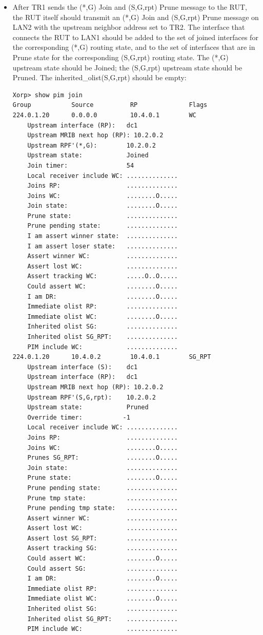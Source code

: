 \documentclass[11pt]{report}
\begin{document}
\begin{itemize}

  \item After TR1 sends the (*,G) Join and (S,G,rpt) Prune message to the RUT,
  the RUT itself should transmit an (*,G) Join and (S,G,rpt) Prune message on
  LAN2 with the upstream neighbor address set to TR2. The interface that
  connects the RUT to LAN1 should be added to the set of joined interfaces for
  the corresponding (*,G) routing state, and to the set of interfaces that are
  in Prune state for the corresponding (S,G,rpt) routing state. The (*,G)
  upstream state should be Joined; the (S,G,rpt) upstream state should be
  Pruned. The inherited\_olist(S,G,rpt) should be empty:

\begin{verbatim}
Xorp> show pim join 
Group           Source          RP              Flags
224.0.1.20      0.0.0.0         10.4.0.1        WC   
    Upstream interface (RP):   dc1
    Upstream MRIB next hop (RP): 10.2.0.2
    Upstream RPF'(*,G):        10.2.0.2
    Upstream state:            Joined 
    Join timer:                54
    Local receiver include WC: ..............
    Joins RP:                  ..............
    Joins WC:                  ........O.....
    Join state:                ........O.....
    Prune state:               ..............
    Prune pending state:       ..............
    I am assert winner state:  ..............
    I am assert loser state:   ..............
    Assert winner WC:          ..............
    Assert lost WC:            ..............
    Assert tracking WC:        .....O..O.....
    Could assert WC:           ........O.....
    I am DR:                   ........O.....
    Immediate olist RP:        ..............
    Immediate olist WC:        ........O.....
    Inherited olist SG:        ..............
    Inherited olist SG_RPT:    ..............
    PIM include WC:            ..............
224.0.1.20      10.4.0.2        10.4.0.1        SG_RPT 
    Upstream interface (S):    dc1
    Upstream interface (RP):   dc1
    Upstream MRIB next hop (RP): 10.2.0.2
    Upstream RPF'(S,G,rpt):    10.2.0.2
    Upstream state:            Pruned 
    Override timer:           -1
    Local receiver include WC: ..............
    Joins RP:                  ..............
    Joins WC:                  ........O.....
    Prunes SG_RPT:             ........O.....
    Join state:                ..............
    Prune state:               ........O.....
    Prune pending state:       ..............
    Prune tmp state:           ..............
    Prune pending tmp state:   ..............
    Assert winner WC:          ..............
    Assert lost WC:            ..............
    Assert lost SG_RPT:        ..............
    Assert tracking SG:        ..............
    Could assert WC:           ........O.....
    Could assert SG:           ..............
    I am DR:                   ........O.....
    Immediate olist RP:        ..............
    Immediate olist WC:        ........O.....
    Inherited olist SG:        ..............
    Inherited olist SG_RPT:    ..............
    PIM include WC:            ..............
\end{verbatim}


\end{itemize}
\end{document}

